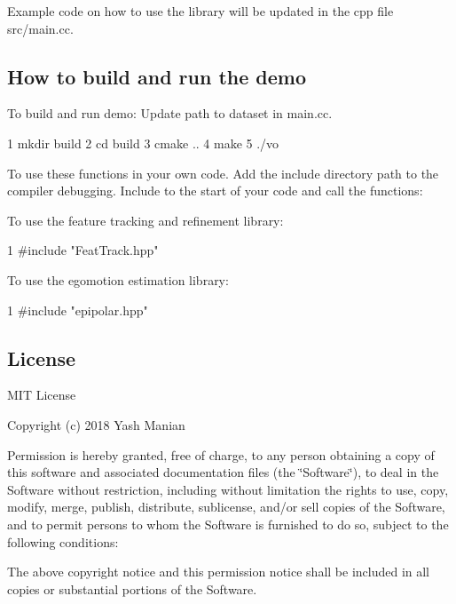 Example code on how to use the library will be updated in the cpp file src/main.\+cc.

\subsection*{How to build and run the demo}


\begin{DoxyItemize}
\item To build and run demo\+: Update path to dataset in main.\+cc. 
\begin{DoxyCode}
1 mkdir build
2 cd build
3 cmake ..
4 make
5 ./vo
\end{DoxyCode}
 To use these functions in your own code. Add the include directory path to the compiler debugging. Include to the start of your code and call the functions\+:
\item To use the feature tracking and refinement library\+: 
\begin{DoxyCode}
1 #include "FeatTrack.hpp" 
\end{DoxyCode}

\item To use the egomotion estimation library\+: 
\begin{DoxyCode}
1 #include "epipolar.hpp" 
\end{DoxyCode}

\end{DoxyItemize}

\subsection*{License}

M\+IT License

Copyright (c) 2018 Yash Manian

Permission is hereby granted, free of charge, to any person obtaining a copy of this software and associated documentation files (the \char`\"{}\+Software\char`\"{}), to deal in the Software without restriction, including without limitation the rights to use, copy, modify, merge, publish, distribute, sublicense, and/or sell copies of the Software, and to permit persons to whom the Software is furnished to do so, subject to the following conditions\+:

The above copyright notice and this permission notice shall be included in all copies or substantial portions of the Software.

